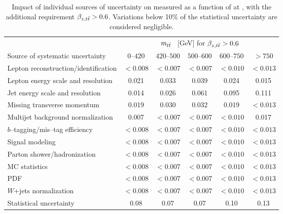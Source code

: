 \begin{table}[!htbp]\centering
\begin{tabular}{l c c c c c}
\toprule
 &\multicolumn{5}{c}{$m_{t\bar{t}}{}$ ~[GeV] for $\beta_{z,t\bar{t}} > 0.6$}    \\
Source of systematic uncertainty           &         $0$--$420$ & $420$--$500$      & $500$--$600$         & $600$--$750$      &   $>750$ \\
\midrule
Lepton reconstruction/identification              & $<0.008$ & $<0.007$ & $<0.007$ & $<0.010$ & $<0.013$  \\
Lepton energy scale and resolution                & 0.021 & 0.033 & 0.039 & 0.024 & 0.015 \\
Jet energy scale and resolution                   & 0.014 & 0.026 & 0.061 & 0.095 & 0.111 \\
Missing transverse momentum & 0.019 & 0.030 & 0.032 & 0.019 & $<0.013$ \\
Multijet background normalization    & 0.007 & $<0.007$ & $<0.007$ & $<0.010$ & 0.017 \\
$b$--tagging/mis--tag efficiency                & $<0.008$ & $<0.007$ & $<0.007$ & $<0.010$ & $<0.013$ \\
Signal modeling                        & $<0.008$ & $<0.007$ & $<0.007$ & $<0.010$ & $<0.013$ \\
Parton shower/hadronization             & $<0.008$ & $<0.007$ & $<0.007$ & $<0.010$ & $<0.013$ \\
MC statistics                 & $<0.008$ & $<0.007$ & $<0.007$ & $<0.010$ & $<0.013$ \\
PDF                                     & $<0.008$ & $<0.007$ & $<0.007$ & $<0.010$ & $<0.013$ \\
$W$+jets normalization        & $<0.008$ & $<0.007$ & $<0.007$ & $<0.010$ & $<0.013$ \\
\midrule
Statistical uncertainty       & 0.08             &        0.07      &        0.07      &       0.10       &         0.13     \\
\bottomrule
\end{tabular}
\caption{Impact of individual sources of uncertainty on
  \ac{} measured as a function of \mtt{} at \seventev{}, with the additional
  requirement $\beta_{z,t\bar{t}}{}>0.6$. Variations below 10\%
  of the statistical uncertainty are considered negligible.}
\label{table:Systematics_mtt_beta}
\end{table}

